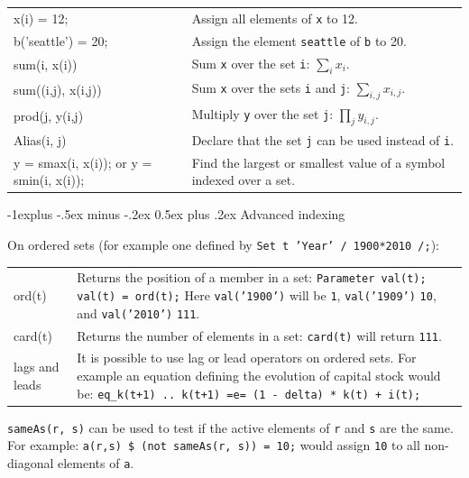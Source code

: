 \documentclass[10pt,landscape,a4paper]{article}
\makeatletter
\renewcommand{\subsection}{\@startsection{subsection}{2}{0mm}%
                                {-1explus -.5ex minus -.2ex}%
                                {0.5ex plus .2ex}%
                                {\normalfont\normalsize\bfseries}}
\makeatother
\begin{document}
\begin{multicols}{2}
\begin{tabularx}{\columnwidth}{@{}>{\ttfamily}lX@{}}
x(i) = 12; & Assign all elements of \texttt{x} to 12.\\
b('seattle') = 20; & Assign the element \texttt{seattle} of \texttt{b} to 20.\\
sum(i, x(i)) & Sum \texttt{x} over the set \texttt{i}: $\sum_{i}x_{i}$.\\
sum((i,j), x(i,j)) & Sum \texttt{x} over the sets \texttt{i} and \texttt{j}: $\sum_{i,j}x_{i,j}$.\\
prod(j, y(i,j) & Multiply \texttt{y} over the set \texttt{j}:
$\prod_{j}y_{i,j}$.\\
Alias(i, j) & Declare that the set \texttt{j} can be used instead of
\texttt{i}.\\
y = smax(i, x(i)); \textrm{or} y = smin(i, x(i)); & Find the largest or smallest
value of a symbol indexed over a set.
\end{tabularx}

\subsection{Advanced indexing}

On ordered sets (for example one defined by \texttt{Set t 'Year' / 1900*2010 /;}):
\begin{tabularx}{\columnwidth}{@{}>{\ttfamily}l>{\raggedright\arraybackslash}X@{}}
ord(t)& Returns the position of a member in a set:\linebreak{}
\texttt{Parameter val(t);}\linebreak{}
\texttt{val(t) = ord(t);}\linebreak{}
Here \texttt{val('1900')} will be \texttt{1}, \texttt{val('1909')} \texttt{10}, and \texttt{val('2010')} \texttt{111}.\\
card(t) & Returns the number of elements in a set: \texttt{card(t)} will return \texttt{111}.\\
\textrm{lags and leads} & It is possible to use lag or lead operators on ordered
sets. For example an equation defining the evolution of capital stock would
be:\linebreak{}
\texttt{eq\_k(t+1) .. k(t+1) =e= (1 - delta) * k(t) + i(t);}
\end{tabularx}

\texttt{sameAs(r, s)} can be used to test if the active elements of \texttt{r}
and \texttt{s} are the same. For example: \texttt{a(r,s) \$ (not sameAs(r, s)) =
  10;} would assign \texttt{10} to all non-diagonal elements of \texttt{a}.


\end{multicols}
\end{document}
